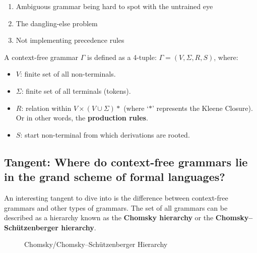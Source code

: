 \begin{enumerate}
    \item Ambiguous grammar being hard to spot with the untrained eye
    \item The dangling-else problem
    \item Not implementing precedence rules
\end{enumerate}

\begin{definition}
    A context-free grammar $\Gamma$ is defined as a 4-tuple: $\Gamma = (V, \Sigma, R, S)$, where:
    \begin{itemize}
        \item $V$: finite set of all non-terminals.
        \item $\Sigma$: finite set of all terminals (tokens).
        \item $R$: relation within $V \times (V \cup \Sigma)*$ (where `$*$' represents the Kleene Closure). Or in other words, the \textbf{production rules}.
        \item $S$: start non-terminal from which derivations are rooted.\textsuperscript{\cite{sipser_1997}}
    \end{itemize}
\end{definition}

\subsection{Tangent: Where do context-free grammars lie in the grand scheme of formal languages?}

An interesting tangent to dive into is the difference between context-free grammars and other types of grammars. The set of all grammars can be described as a hierarchy known as the \textbf{Chomsky hierarchy} or the \textbf{Chomsky–Schützenberger hierarchy}.\textsuperscript{\cite{chomsky_1956}}

\begin{figure}[h]
    \begin{center}
        \caption{\label{fig:3.2}Chomsky/Chomsky–Schützenberger Hierarchy}
    \end{center}
\end{figure}

